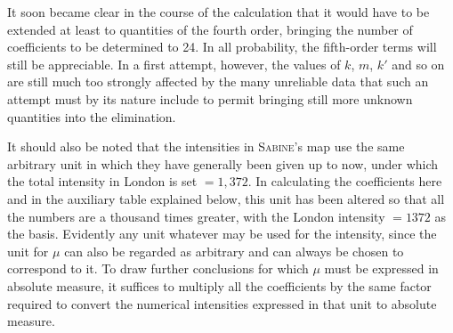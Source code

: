 It soon became clear in the course of the calculation that it would have to be extended at least to quantities of the fourth order, bringing the number of coefficients to be determined to 24. In all probability, the fifth-order terms will still be appreciable. In a first attempt, however, the values of $k$, $m$, $k'$ and so on are still much too strongly affected by the many unreliable data that such an attempt must by its nature include to permit bringing still more unknown quantities into the elimination.

It should also be noted that the intensities in \textsc{Sabine}'s map use the same arbitrary unit in which they have generally been given up to now, under which the total intensity in London is set $=1{,}372$. In calculating the coefficients here and in the auxiliary table explained below, this unit has been altered so that all the numbers are a thousand times greater, with the London intensity $=1372$ as the basis. Evidently any unit whatever may be used for the intensity, since the unit for $\mu$ can also be regarded as arbitrary and can always be chosen to correspond to it. To draw further conclusions for which $\mu$ must be expressed in absolute measure, it suffices to multiply all the coefficients by the same factor required to convert the numerical intensities expressed in that unit to absolute measure.


